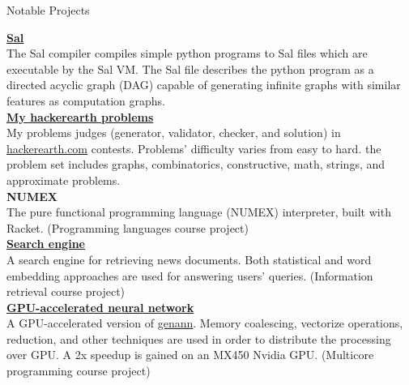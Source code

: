 \documentclass{resume} %
\begin{document}
\begin{rSection}{Notable Projects}

 
    {\bf \href{https://github.com/amsen20/Sal}{Sal}}
    \\
	The Sal compiler compiles simple python programs to Sal files which are executable by the Sal VM. The Sal file describes the python program as a directed acyclic graph (DAG) capable of generating infinite graphs with similar features as computation graphs.
    \vspace{2mm}\\
    {\bf \href{https://github.com/amsen20/hackerearth-problems}{My hackerearth problems}} 
    \\
    My problems judges (generator, validator, checker, and solution) in \href{https://www.hackerearth.com/}{hackerearth.com} contests. Problems' difficulty varies from easy to hard. the problem set includes graphs, combinatorics, constructive, math, strings, and approximate problems.
    \vspace{2mm}\\
    {\bf NUMEX}
    \\
    The pure functional programming language (NUMEX) interpreter, built with Racket. (Programming languages course project)
    \vspace{2mm}\\
    {\bf \href{https://github.com/amsen20/search-engine}{Search engine}}
    \\
    A search engine for retrieving news documents. Both statistical and word embedding approaches are used for answering users' queries. (Information retrieval course project)
    \vspace{2mm}\\
    {\bf \href{https://github.com/amsen20/MCP/tree/main/project/phase-two-GPU}{GPU-accelerated neural network}} %
    \\
    A GPU-accelerated version of \href{https://www.google.com/search?q=genann&oq=genann&aqs=chrome.0.69i59j69i57j69i59j69i60l5.721j0j4&sourceid=chrome&ie=UTF-8}{genann}. Memory coalescing, vectorize operations, reduction, and other techniques are used in order to distribute the processing over GPU. A 2x speedup is gained on an MX450 Nvidia GPU. (Multicore programming course project)
\end{rSection}
\end{document}
